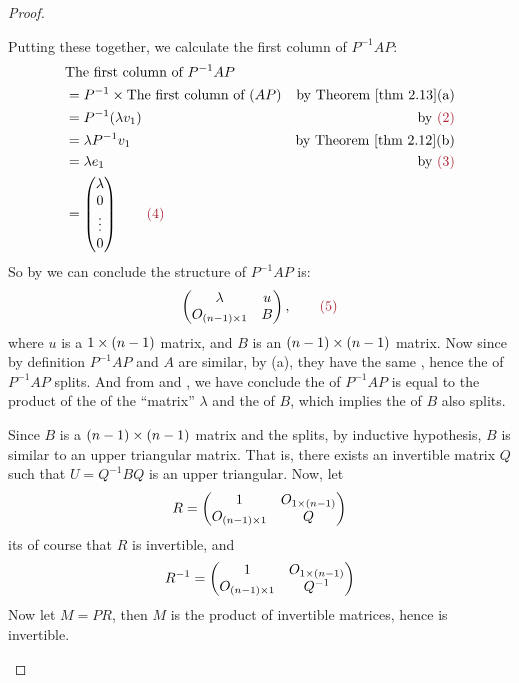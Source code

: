 \begin{proof}
\begin{enumerate}
Putting these together, we calculate the first column of \(P^{-1} A P\):
\begin{align*}
    & \text{The first column of } P^{-1} A P \\
    & = P^{-1} \X \text{The first column of } (AP) & \text{by \THM{2.13}(a)} \\
    & = P^{-1} (\lambda v_1) & \text{by \MAROON{(2)}} \\
    & = \lambda P^{-1} v_1 & \text{by \THM{2.12}(b)} \\
    & = \lambda e_1 & \text{by \MAROON{(3)}} \\
    & = \begin{pmatrix}
            \lambda \\
            0 \\
            \vdots \\
            0
    \end{pmatrix} \quad \quad \MAROON{(4)}
\end{align*}
So by  we can conclude the structure of \(P^{-1} A P\) is:
\[
    \begin{pmatrix}
        \lambda & u \\
        O_{(n - 1) \X 1} & B
    \end{pmatrix}, \quad \quad \MAROON{(5)}
\]
where \(u\) is a \(1 \times (n - 1)\) matrix, and \(B\) is an \((n - 1) \times (n - 1)\) matrix.
Now since by definition \(P^{-1} A P\) and \(A\) are similar, by (a),
they have the same \CPOLY{}, hence the \CPOLY{} of \(P^{-1} A P\) splits.
And from  and , we have conclude the \CPOLY{} of \(P^{-1} A P\) is equal to the product of the \CPOLY{} of the ``matrix'' \(\lambda\) and the \CPOLY{} of \(B\),
which implies the \CPOLY{} of \(B\) also splits.

Since \(B\) is a \((n - 1) \times (n - 1)\) matrix and the \CPOLY{} splits, by inductive hypothesis, \(B\) is similar to an upper triangular matrix.
That is, there exists an invertible matrix \(Q\) such that \(U = Q^{-1} B Q\) is an upper triangular.
Now, let
\[
    R = \begin{pmatrix}
        1 & O_{1 \times (n - 1)} \\
        O_{(n - 1) \times 1} & Q
    \end{pmatrix}
\]
its of course that \(R\) is invertible, and
\[
    R^{-1} = \begin{pmatrix}
        1 & O_{1 \times (n - 1)} \\
        O_{(n - 1) \times 1} & Q^{-1}
    \end{pmatrix}
\]
Now let \(M = PR\), then \(M\) is the product of invertible matrices, hence is invertible.


\end{enumerate}
\end{proof}

